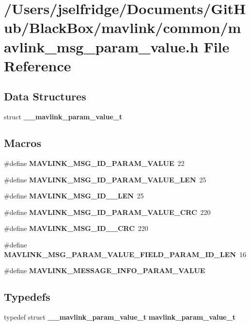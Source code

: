 \section{/\+Users/jselfridge/\+Documents/\+Git\+Hub/\+Black\+Box/mavlink/common/mavlink\+\_\+msg\+\_\+param\+\_\+value.h File Reference}
\label{mavlink__msg__param__value_8h}
\subsection*{Data Structures}
\begin{DoxyCompactItemize}
\item 
struct \textbf{ \+\_\+\+\_\+mavlink\+\_\+param\+\_\+value\+\_\+t}
\end{DoxyCompactItemize}
\subsection*{Macros}
\begin{DoxyCompactItemize}
\item 
\#define \textbf{ M\+A\+V\+L\+I\+N\+K\+\_\+\+M\+S\+G\+\_\+\+I\+D\+\_\+\+P\+A\+R\+A\+M\+\_\+\+V\+A\+L\+UE}~22
\item 
\#define \textbf{ M\+A\+V\+L\+I\+N\+K\+\_\+\+M\+S\+G\+\_\+\+I\+D\+\_\+\+P\+A\+R\+A\+M\+\_\+\+V\+A\+L\+U\+E\+\_\+\+L\+EN}~25
\item 
\#define \textbf{ M\+A\+V\+L\+I\+N\+K\+\_\+\+M\+S\+G\+\_\+\+I\+D\+\_\+\_\+\+L\+EN}~25
\item 
\#define \textbf{ M\+A\+V\+L\+I\+N\+K\+\_\+\+M\+S\+G\+\_\+\+I\+D\+\_\+\+P\+A\+R\+A\+M\+\_\+\+V\+A\+L\+U\+E\+\_\+\+C\+RC}~220
\item 
\#define \textbf{ M\+A\+V\+L\+I\+N\+K\+\_\+\+M\+S\+G\+\_\+\+I\+D\+\_\+\_\+\+C\+RC}~220
\item 
\#define \textbf{ M\+A\+V\+L\+I\+N\+K\+\_\+\+M\+S\+G\+\_\+\+P\+A\+R\+A\+M\+\_\+\+V\+A\+L\+U\+E\+\_\+\+F\+I\+E\+L\+D\+\_\+\+P\+A\+R\+A\+M\+\_\+\+I\+D\+\_\+\+L\+EN}~16
\item 
\#define \textbf{ M\+A\+V\+L\+I\+N\+K\+\_\+\+M\+E\+S\+S\+A\+G\+E\+\_\+\+I\+N\+F\+O\+\_\+\+P\+A\+R\+A\+M\+\_\+\+V\+A\+L\+UE}
\end{DoxyCompactItemize}
\subsection*{Typedefs}
\begin{DoxyCompactItemize}
\item 
typedef struct \textbf{ \+\_\+\+\_\+mavlink\+\_\+param\+\_\+value\+\_\+t} \textbf{ mavlink\+\_\+param\+\_\+value\+\_\+t}
\end{DoxyCompactItemize}


